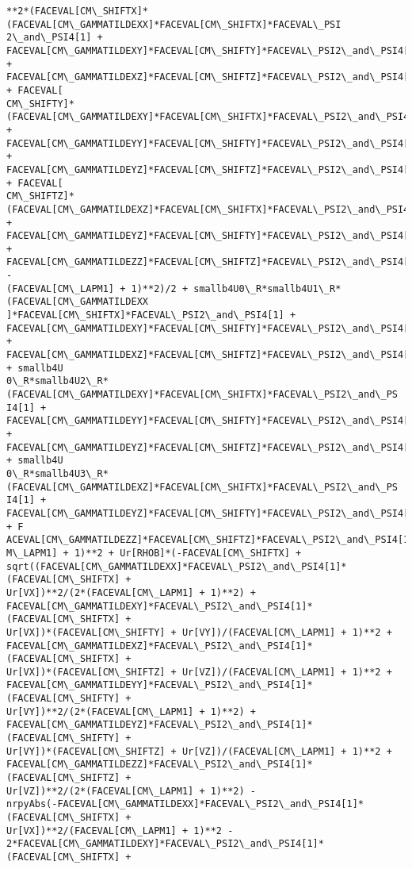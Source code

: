 \documentclass[landscape,letterpaper,10pt,english]{article}
\begin{document}
\begin{Verbatim}[commandchars=\\\{\}]
**2*(FACEVAL[CM\_SHIFTX]*(FACEVAL[CM\_GAMMATILDEXX]*FACEVAL[CM\_SHIFTX]*FACEVAL\_PSI
2\_and\_PSI4[1] +
FACEVAL[CM\_GAMMATILDEXY]*FACEVAL[CM\_SHIFTY]*FACEVAL\_PSI2\_and\_PSI4[1] +
FACEVAL[CM\_GAMMATILDEXZ]*FACEVAL[CM\_SHIFTZ]*FACEVAL\_PSI2\_and\_PSI4[1]) + FACEVAL[
CM\_SHIFTY]*(FACEVAL[CM\_GAMMATILDEXY]*FACEVAL[CM\_SHIFTX]*FACEVAL\_PSI2\_and\_PSI4[1]
+ FACEVAL[CM\_GAMMATILDEYY]*FACEVAL[CM\_SHIFTY]*FACEVAL\_PSI2\_and\_PSI4[1] +
FACEVAL[CM\_GAMMATILDEYZ]*FACEVAL[CM\_SHIFTZ]*FACEVAL\_PSI2\_and\_PSI4[1]) + FACEVAL[
CM\_SHIFTZ]*(FACEVAL[CM\_GAMMATILDEXZ]*FACEVAL[CM\_SHIFTX]*FACEVAL\_PSI2\_and\_PSI4[1]
+ FACEVAL[CM\_GAMMATILDEYZ]*FACEVAL[CM\_SHIFTY]*FACEVAL\_PSI2\_and\_PSI4[1] +
FACEVAL[CM\_GAMMATILDEZZ]*FACEVAL[CM\_SHIFTZ]*FACEVAL\_PSI2\_and\_PSI4[1]) -
(FACEVAL[CM\_LAPM1] + 1)**2)/2 + smallb4U0\_R*smallb4U1\_R*(FACEVAL[CM\_GAMMATILDEXX
]*FACEVAL[CM\_SHIFTX]*FACEVAL\_PSI2\_and\_PSI4[1] +
FACEVAL[CM\_GAMMATILDEXY]*FACEVAL[CM\_SHIFTY]*FACEVAL\_PSI2\_and\_PSI4[1] +
FACEVAL[CM\_GAMMATILDEXZ]*FACEVAL[CM\_SHIFTZ]*FACEVAL\_PSI2\_and\_PSI4[1]) + smallb4U
0\_R*smallb4U2\_R*(FACEVAL[CM\_GAMMATILDEXY]*FACEVAL[CM\_SHIFTX]*FACEVAL\_PSI2\_and\_PS
I4[1] + FACEVAL[CM\_GAMMATILDEYY]*FACEVAL[CM\_SHIFTY]*FACEVAL\_PSI2\_and\_PSI4[1] +
FACEVAL[CM\_GAMMATILDEYZ]*FACEVAL[CM\_SHIFTZ]*FACEVAL\_PSI2\_and\_PSI4[1]) + smallb4U
0\_R*smallb4U3\_R*(FACEVAL[CM\_GAMMATILDEXZ]*FACEVAL[CM\_SHIFTX]*FACEVAL\_PSI2\_and\_PS
I4[1] + FACEVAL[CM\_GAMMATILDEYZ]*FACEVAL[CM\_SHIFTY]*FACEVAL\_PSI2\_and\_PSI4[1] + F
ACEVAL[CM\_GAMMATILDEZZ]*FACEVAL[CM\_SHIFTZ]*FACEVAL\_PSI2\_and\_PSI4[1]))/(FACEVAL[C
M\_LAPM1] + 1)**2 + Ur[RHOB]*(-FACEVAL[CM\_SHIFTX] +
sqrt((FACEVAL[CM\_GAMMATILDEXX]*FACEVAL\_PSI2\_and\_PSI4[1]*(FACEVAL[CM\_SHIFTX] +
Ur[VX])**2/(2*(FACEVAL[CM\_LAPM1] + 1)**2) +
FACEVAL[CM\_GAMMATILDEXY]*FACEVAL\_PSI2\_and\_PSI4[1]*(FACEVAL[CM\_SHIFTX] +
Ur[VX])*(FACEVAL[CM\_SHIFTY] + Ur[VY])/(FACEVAL[CM\_LAPM1] + 1)**2 +
FACEVAL[CM\_GAMMATILDEXZ]*FACEVAL\_PSI2\_and\_PSI4[1]*(FACEVAL[CM\_SHIFTX] +
Ur[VX])*(FACEVAL[CM\_SHIFTZ] + Ur[VZ])/(FACEVAL[CM\_LAPM1] + 1)**2 +
FACEVAL[CM\_GAMMATILDEYY]*FACEVAL\_PSI2\_and\_PSI4[1]*(FACEVAL[CM\_SHIFTY] +
Ur[VY])**2/(2*(FACEVAL[CM\_LAPM1] + 1)**2) +
FACEVAL[CM\_GAMMATILDEYZ]*FACEVAL\_PSI2\_and\_PSI4[1]*(FACEVAL[CM\_SHIFTY] +
Ur[VY])*(FACEVAL[CM\_SHIFTZ] + Ur[VZ])/(FACEVAL[CM\_LAPM1] + 1)**2 +
FACEVAL[CM\_GAMMATILDEZZ]*FACEVAL\_PSI2\_and\_PSI4[1]*(FACEVAL[CM\_SHIFTZ] +
Ur[VZ])**2/(2*(FACEVAL[CM\_LAPM1] + 1)**2) -
nrpyAbs(-FACEVAL[CM\_GAMMATILDEXX]*FACEVAL\_PSI2\_and\_PSI4[1]*(FACEVAL[CM\_SHIFTX] +
Ur[VX])**2/(FACEVAL[CM\_LAPM1] + 1)**2 -
2*FACEVAL[CM\_GAMMATILDEXY]*FACEVAL\_PSI2\_and\_PSI4[1]*(FACEVAL[CM\_SHIFTX] +

\end{Verbatim}
\end{document}

